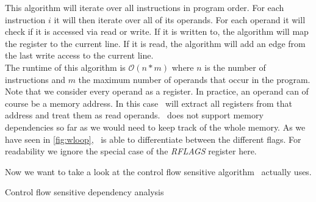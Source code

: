 This algorithm will iterate over all instructions in program order. For each instruction $i$ it will then iterate over all of its operands. For each operand it will check if it is accessed via read or write. If it is written to, the algorithm will map the register to the current line. If it is read, the algorithm will add an edge from the last write access to the current line.\\

The runtime of this algorithm is $\mathcal{O}(n*m)$ where $n$ is the number of instructions and $m$ the maximum number of operands that occur in the program.\\

Note that we consider every operand as a register. In practice, an operand can of course be a memory address. In this case \suaca\ will extract all registers from that address and treat them as read operands. \suaca\ does not support memory dependencies so far as we would need to keep track of the whole memory. As we have seen in \autoref{fig:wloop}, \suaca\ is able to differentiate between the different flags. For readability we ignore the special case of the \emph{RFLAGS} register here.

Now we want to take a look at the control flow sensitive algorithm \suaca\ actually uses. 
\newpage

\begin{algorithm}[H]
    \SetAlgoLined
    \caption{Control flow sensitive dependency analysis}
    \label{alg:dep}
\end{algorithm}
\vspace{5pt}

